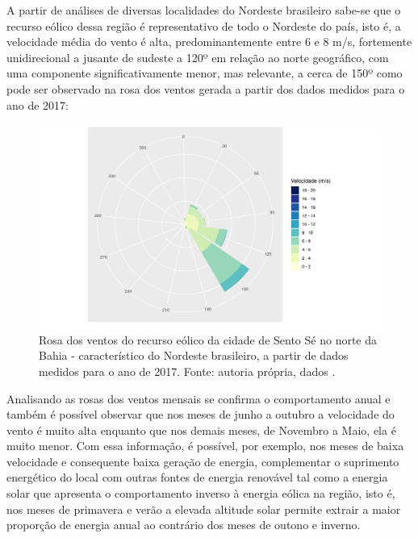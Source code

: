 \documentclass[
	12pt,				%
	openright,			%
	oneside,			%
	a4paper,			%
	english,			%
	french,				%
	spanish,			%
	brazil				%
	]{abntex2}
\begin{document}
A partir de análises de diversas localidades do Nordeste brasileiro sabe-se que o recurso eólico dessa região é representativo de todo o Nordeste do país, isto é, a velocidade média do vento é alta, predominantemente entre 6 e 8 m/s, fortemente unidirecional a jusante de sudeste a 120º em relação ao norte geográfico, com uma componente significativamente menor, mas relevante, a cerca de 150º como pode ser observado na rosa dos ventos gerada a partir dos dados medidos para o ano de 2017:

\begin{figure}[h]
    \centering
	\includegraphics[scale=0.9]{windrose}
	\caption{Rosa dos ventos do recurso eólico da cidade de Sento Sé no norte da Bahia - característico do Nordeste brasileiro,  a partir de dados medidos para o ano de 2017. Fonte: autoria própria, dados \cite{era5}.}
\end{figure}
\FloatBarrier

\newpage
Analisando as rosas dos ventos mensais se confirma o comportamento anual e também é possível observar que nos meses de junho a outubro a velocidade do vento é muito alta enquanto que nos demais meses, de Novembro a Maio, ela é muito menor. Com essa informação, é possível, por exemplo, nos meses de baixa velocidade e consequente baixa geração de energia, complementar o suprimento energético do local com outras fontes de energia renovável tal como a energia solar que apresenta o comportamento inverso à energia eólica na região, isto é, nos meses de primavera e verão a elevada altitude solar permite extrair a maior proporção de energia anual ao contrário dos meses de outono e inverno.
\end{document}
